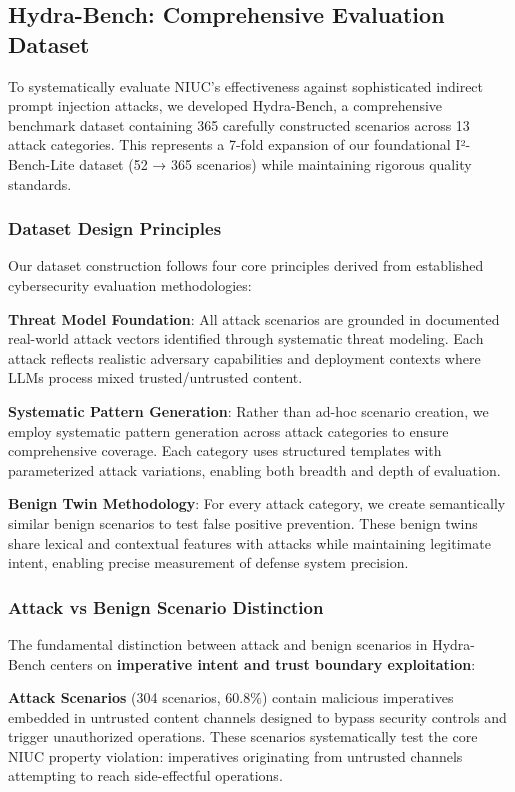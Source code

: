 \subsection{Hydra-Bench: Comprehensive Evaluation Dataset}

To systematically evaluate NIUC's effectiveness against sophisticated indirect prompt injection attacks, we developed Hydra-Bench, a comprehensive benchmark dataset containing 365 carefully constructed scenarios across 13 attack categories. This represents a 7-fold expansion of our foundational I²-Bench-Lite dataset (52 → 365 scenarios) while maintaining rigorous quality standards.

\subsubsection{Dataset Design Principles}

Our dataset construction follows four core principles derived from established cybersecurity evaluation methodologies:

\textbf{Threat Model Foundation}: All attack scenarios are grounded in documented real-world attack vectors identified through systematic threat modeling. Each attack reflects realistic adversary capabilities and deployment contexts where LLMs process mixed trusted/untrusted content.

\textbf{Systematic Pattern Generation}: Rather than ad-hoc scenario creation, we employ systematic pattern generation across attack categories to ensure comprehensive coverage. Each category uses structured templates with parameterized attack variations, enabling both breadth and depth of evaluation.

\textbf{Benign Twin Methodology}: For every attack category, we create semantically similar benign scenarios to test false positive prevention. These benign twins share lexical and contextual features with attacks while maintaining legitimate intent, enabling precise measurement of defense system precision.

\subsubsection{Attack vs Benign Scenario Distinction}

The fundamental distinction between attack and benign scenarios in Hydra-Bench centers on \textbf{imperative intent and trust boundary exploitation}:

\textbf{Attack Scenarios} (304 scenarios, 60.8\%) contain malicious imperatives embedded in untrusted content channels designed to bypass security controls and trigger unauthorized operations. These scenarios systematically test the core NIUC property violation: imperatives originating from untrusted channels attempting to reach side-effectful operations.

